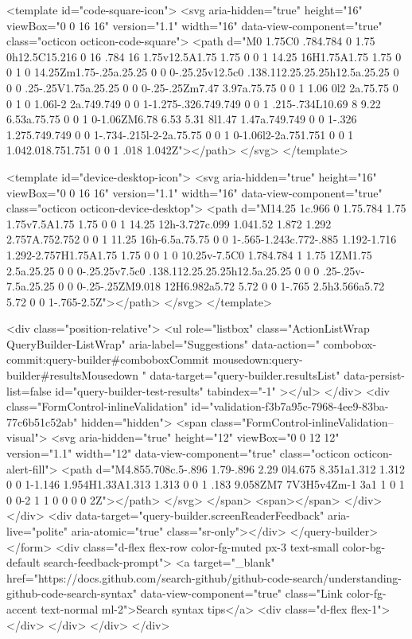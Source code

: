 <template id="code-square-icon">
  <svg aria-hidden="true" height="16" viewBox="0 0 16 16" version="1.1" width="16" data-view-component="true" class="octicon octicon-code-square">
    <path d="M0 1.75C0 .784.784 0 1.75 0h12.5C15.216 0 16 .784 16 1.75v12.5A1.75 1.75 0 0 1 14.25 16H1.75A1.75 1.75 0 0 1 0 14.25Zm1.75-.25a.25.25 0 0 0-.25.25v12.5c0 .138.112.25.25.25h12.5a.25.25 0 0 0 .25-.25V1.75a.25.25 0 0 0-.25-.25Zm7.47 3.97a.75.75 0 0 1 1.06 0l2 2a.75.75 0 0 1 0 1.06l-2 2a.749.749 0 0 1-1.275-.326.749.749 0 0 1 .215-.734L10.69 8 9.22 6.53a.75.75 0 0 1 0-1.06ZM6.78 6.53 5.31 8l1.47 1.47a.749.749 0 0 1-.326 1.275.749.749 0 0 1-.734-.215l-2-2a.75.75 0 0 1 0-1.06l2-2a.751.751 0 0 1 1.042.018.751.751 0 0 1 .018 1.042Z"></path>
</svg>
</template>

<template id="device-desktop-icon">
  <svg aria-hidden="true" height="16" viewBox="0 0 16 16" version="1.1" width="16" data-view-component="true" class="octicon octicon-device-desktop">
    <path d="M14.25 1c.966 0 1.75.784 1.75 1.75v7.5A1.75 1.75 0 0 1 14.25 12h-3.727c.099 1.041.52 1.872 1.292 2.757A.752.752 0 0 1 11.25 16h-6.5a.75.75 0 0 1-.565-1.243c.772-.885 1.192-1.716 1.292-2.757H1.75A1.75 1.75 0 0 1 0 10.25v-7.5C0 1.784.784 1 1.75 1ZM1.75 2.5a.25.25 0 0 0-.25.25v7.5c0 .138.112.25.25.25h12.5a.25.25 0 0 0 .25-.25v-7.5a.25.25 0 0 0-.25-.25ZM9.018 12H6.982a5.72 5.72 0 0 1-.765 2.5h3.566a5.72 5.72 0 0 1-.765-2.5Z"></path>
</svg>
</template>

        <div class="position-relative">
                <ul
                  role="listbox"
                  class="ActionListWrap QueryBuilder-ListWrap"
                  aria-label="Suggestions"
                  data-action="
                    combobox-commit:query-builder#comboboxCommit
                    mousedown:query-builder#resultsMousedown
                  "
                  data-target="query-builder.resultsList"
                  data-persist-list=false
                  id="query-builder-test-results"
                  tabindex="-1"
                ></ul>
        </div>
      <div class="FormControl-inlineValidation" id="validation-f3b7a95c-7968-4ee9-83ba-77c6b51c52ab" hidden="hidden">
        <span class="FormControl-inlineValidation--visual">
          <svg aria-hidden="true" height="12" viewBox="0 0 12 12" version="1.1" width="12" data-view-component="true" class="octicon octicon-alert-fill">
    <path d="M4.855.708c.5-.896 1.79-.896 2.29 0l4.675 8.351a1.312 1.312 0 0 1-1.146 1.954H1.33A1.313 1.313 0 0 1 .183 9.058ZM7 7V3H5v4Zm-1 3a1 1 0 1 0 0-2 1 1 0 0 0 0 2Z"></path>
</svg>
        </span>
        <span></span>
</div>    </div>
    <div data-target="query-builder.screenReaderFeedback" aria-live="polite" aria-atomic="true" class="sr-only"></div>
</query-builder></form>
          <div class="d-flex flex-row color-fg-muted px-3 text-small color-bg-default search-feedback-prompt">
            <a target="_blank" href="https://docs.github.com/search-github/github-code-search/understanding-github-code-search-syntax" data-view-component="true" class="Link color-fg-accent text-normal ml-2">Search syntax tips</a>            <div class="d-flex flex-1"></div>
          </div>
        </div>
</div>


